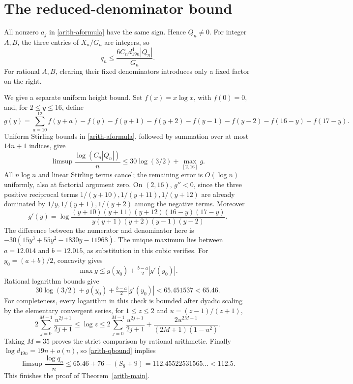 \documentclass[11pt]{article}
\begin{document}
\section{The reduced-denominator bound}
All nonzero $a_j$ in \eqref{arith-aformula} have the same sign. Hence $Q_n\ne0$.
For integer $A,B$, the three entries of $X_n/G_n$ are integers, so
\begin{equation}\label{arith-qbound}
 q_n\leq\frac{6C_nd_{19n}^4|Q_n|}{G_n}.
\end{equation}
For rational $A,B$, clearing their fixed denominators introduces only a
fixed factor on the right.

We give a separate uniform height bound. Set $f(x)=x\log x$, with $f(0)=0$,
and, for $2\leq y\leq16$, define
\[
 g(y)=\sum_{a=10}^{12}f(y+a)
 -f(y)-f(y+1)-f(y+2)-f(y-1)-f(y-2)-f(16-y)-f(17-y).
\]
Uniform Stirling bounds in \eqref{arith-aformula}, followed by summation over
at most $14n+1$ indices, give
\[
 \limsup\frac{\log(C_n|Q_n|)}n
 \leq30\log(3/2)+\max_{[2,16]}g.
\]
All $n\log n$ and linear Stirling terms cancel; the remaining error is
$O(\log n)$ uniformly, also at factorial argument zero.
On $(2,16)$, $g''<0$, since the three positive reciprocal terms
$1/(y+10),1/(y+11),1/(y+12)$ are already dominated by
$1/y,1/(y+1),1/(y+2)$ among the negative terms. Moreover
\[
 g'(y)=\log\frac{(y+10)(y+11)(y+12)(16-y)(17-y)}
 {y(y+1)(y+2)(y-1)(y-2)}.
\]
The difference between the numerator and denominator here is
$-30(15y^3+55y^2-1830y-11968)$.
The unique maximum lies between $a=12.014$ and $b=12.015$, as substitution
in this cubic verifies. For $y_0=(a+b)/2$, concavity gives
\[
 \max g\leq g(y_0)+\tfrac{b-a}{2}|g'(y_0)|.
\]
Rational logarithm bounds give
\[
 30\log(3/2)+g(y_0)+\tfrac{b-a}{2}|g'(y_0)|
 <65.451537<65.46.
\]
For completeness, every logarithm in this check is bounded after dyadic
scaling by the elementary convergent series, for $1\leq z\leq2$ and
$u=(z-1)/(z+1)$,
\[
 2\sum_{j=0}^{M-1}\frac{u^{2j+1}}{2j+1}
 \leq\log z\leq
 2\sum_{j=0}^{M-1}\frac{u^{2j+1}}{2j+1}
 +\frac{2u^{2M+1}}{(2M+1)(1-u^2)}.
\]
Taking $M=35$ proves the strict comparison by rational arithmetic.
Finally $\log d_{19n}=19n+o(n)$, so \eqref{arith-qbound} implies
\[
 \limsup\frac{\log q_n}n
 \leq65.46+76-(S_8+9)
 =112.45522531565\ldots<112.5.
\]
This finishes the proof of Theorem~\ref{arith-main}.
\end{document}
